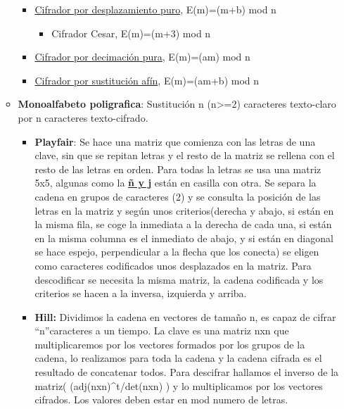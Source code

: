 \documentclass[12pt, twoside, openright]{report} %
\begin{document}
\begin{itemize}
\begin{itemize}
      \begin{itemize}
      \item \underline{Cifrador por desplazamiento puro}, E(m)=(m+b) mod n
        

        \begin{itemize}
        \item Cifrador Cesar, E(m)=(m+3) mod n
          
        \end{itemize}
      \item \underline{Cifrador por decimación pura}, E(m)=(am) mod n
        
      \item \underline{Cifrador por sustitución afín}, E(m)=(am+b) mod n
        
      \end{itemize}
    \item \textbf{Monoalfabeto poligrafica}: Sustitución n (n\textgreater=2)
      caracteres texto-claro por n caracteres texto-cifrado.
      

      \begin{itemize}
      \item \textbf{Playfair}: Se hace una matriz que comienza con las
        letras de una clave, sin que se repitan letras y el resto de la
        matriz se rellena con el resto de las letras en orden. Para
        todas la letras se usa una matriz 5x5, algunas como la
        \textbf{\underline{ñ y j}} están en casilla con otra. Se separa
        la cadena en grupos de caracteres (2) y se consulta la posición
        de las letras en la matriz y según unos criterios(derecha y
        abajo, si están en la misma fila, se coge la inmediata a la
        derecha de cada una, si están en la misma columna es el
        inmediato de abajo, y si están en diagonal se hace espejo,
        perpendicular a la flecha que los conecta) se eligen como
        caracteres codificados unos desplazados en la matriz. Para
        descodificar se necesita la misma matriz, la cadena codificada y
        los criterios se hacen a la inversa, izquierda y arriba.
        
      \item \textbf{Hill:} Dividimos la cadena en vectores de tamaño n, es
        capaz de cifrar ``n''caracteres a un tiempo. La clave es una
        matriz nxn que multiplicaremos por los vectores formados por los
        grupos de la cadena, lo realizamos para toda la cadena y la
        cadena cifrada es el resultado de concatenar todos. Para
        descifrar hallamos el inverso de la matriz(
        (adj(nxn)\^{}t/det(nxn) ) y lo multiplicamos por los vectores
        cifrados. Los valores deben estar en mod numero de letras.
        

\end{itemize}
\end{itemize}
\end{itemize}
\end{document}

